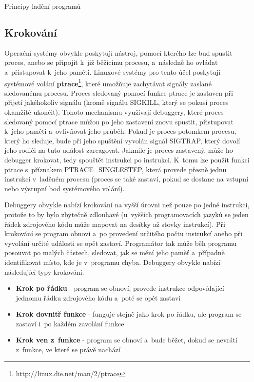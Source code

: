 \documentclass[czech,bachelor,male,python,dept460,hidelinks]{diploma}						%
\newcommand{\parspace}[1][]{
	\ifthenelse{\isempty{#1}}{\vspace{0mm}}{\vspace{#1}}
	\par
}
\begin{document}
\begin{section}{Principy ladění programů}
	\subsection{Krokování}
		Operační systémy obvykle poskytují nástroj, pomocí kterého lze buď spustit proces, anebo se připojit k~již běžícímu procesu, a~následně ho ovládat
		a~přistupovat k~jeho paměti. Linuxové systémy pro tento účel poskytují systémové volání \textbf{ptrace}\footnote{http://linux.die.net/man/2/ptrace},
		které umožňuje zachytávat signály zaslané sledovanému procesu. Proces sledovaný pomocí funkce ptrace je zastaven při přijetí jakéhokoliv signálu
		(kromě signálu SIGKILL, který se pokusí proces okamžitě ukončit). Tohoto mechanismu využívají debuggery, které proces sledovaný pomocí
		ptrace můžou po jeho zastavení znovu spustit, přistupovat k~jeho paměti a~ovlivňovat jeho průběh. Pokud je proces potomkem procesu,
		který ho sleduje, bude při jeho spuštění vyvolán signál SIGTRAP, který dovolí jeho rodiči na tuto událost zareagovat. Jakmile je proces
		zastavený, může ho debugger krokovat, tedy spouštět instrukci po instrukci. K~tomu lze použít funkci ptrace s~příznakem PTRACE\_SINGLESTEP,
		která provede přesně jednu instrukci v~laděném procesu (proces se také zastaví, pokud se dostane na vstupní nebo výstupní bod systémového volání).
		
		\parspace Debuggery obvykle nabízí krokování na vyšší úrovni než pouze po jedné instrukci, protože to by bylo zbytečně zdlouhavé (u~vyšších
		programovacích jazyků se jeden řádek zdrojového kódu může mapovat na desítky až stovky instrukcí).
		Při krokování se program obnoví a~po provedení určitého počtu instrukcí anebo při vyvolání určité události se opět zastaví. Programátor tak může
		běh programu posouvat po malých částech, sledovat, jak se mění jeho paměť a~případně identifikovat místo, kde je v~programu chyba.
		Debuggery obvykle nabízí následující typy krokování.
		
		\begin{itemize}
			\item \textbf{Krok po řádku} - program se obnoví, provede instrukce odpovídající jednomu řádku zdrojového kódu a~poté se opět zastaví
			\item \textbf{Krok dovnitř funkce} - funguje stejně jako krok po řádku, ale program se zastaví i~po každém zavolání funkce
			\item \textbf{Krok ven z~funkce} - program se obnoví a~bude běžet, dokud se nevrátí z~funkce, ve které se právě nachází
		\end{itemize}
		

\end{section}
\end{document}
